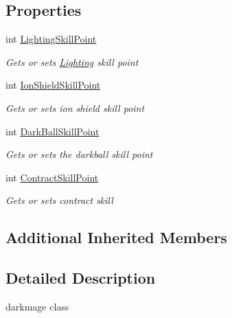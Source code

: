 \subsection*{Properties}
\begin{DoxyCompactItemize}
\item 
int \hyperlink{class_lightdeath_1_1_dark_mage_a73295fab5ee78af8a6d0e5b5976bd4f7}{Lighting\+Skill\+Point}
\begin{DoxyCompactList}\small\item\em Gets or sets \hyperlink{class_lightdeath_1_1_lighting}{Lighting} skill point \end{DoxyCompactList}\item 
int \hyperlink{class_lightdeath_1_1_dark_mage_a64ba6d662fc9c6be2fcb65cca9c475e8}{Ion\+Shield\+Skill\+Point}
\begin{DoxyCompactList}\small\item\em Gets or sets ion shield skill point \end{DoxyCompactList}\item 
int \hyperlink{class_lightdeath_1_1_dark_mage_aeb95de4356223b8f435bb42958cdc9dd}{Dark\+Ball\+Skill\+Point}
\begin{DoxyCompactList}\small\item\em Gets or sets the darkball skill point \end{DoxyCompactList}\item 
int \hyperlink{class_lightdeath_1_1_dark_mage_a803827ae41700067722dd65fda17768f}{Contract\+Skill\+Point}
\begin{DoxyCompactList}\small\item\em Gets or sets contract skill \end{DoxyCompactList}\end{DoxyCompactItemize}
\subsection*{Additional Inherited Members}


\subsection{Detailed Description}
darkmage class 



